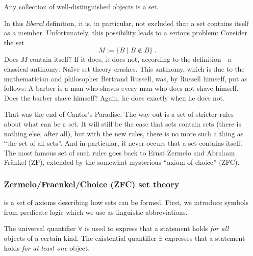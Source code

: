 \begin{definition}\label{def:cantor}
Any collection of well-distinguished objects is a set.
\end{definition}

In this \emph{liberal} definition, it is, in particular, not excluded that a set contains itself as a member. 
Unfortunately, this possibility leads to a serious problem:  
Consider the set
\[
M:=\{B \mid B \notin B\}\; .
\]
Does \(M\) contain itself?  If it does, it does not, according to the definition—a classical antinomy:  
Naïve set theory crashes.
This antinomy, which is due to the mathematician and philosopher Bertrand Russell, was, by Russell himself, put as follows: 
A barber is a man who shaves every man who does not shave himself. 
Does the barber shave himself? 
Again, he does exactly when he does not.

That was the end of Cantor's Paradise. 
The way out is a set of stricter rules about what can be a set. 
It will still be the case that sets contain sets (there is nothing else, after all), but with the new rules, there is no more such a thing as ``the set of all sets''. 
And in particular, it never occurs that a set contains itself. 
The most famous set of such rules goes back to Ernst Zermelo and Abraham Fränkel (ZF), extended by the somewhat mysterious ``axiom of choice'' (ZFC).

\subsubsection{Zermelo/Fraenkel/Choice (ZFC) set theory}\label{subsubsec:zfc}
is a set of axioms describing how sets can be formed.
First, we introduce symbols from predicate logic which we use as linguistic abbreviations.

\begin{definition}[Quantifiers]\label{def:quantifiers}
The universal quantifier \(\forall\) is used to express that a statement holds \emph{for all} objects of a certain kind.
The existential quantifier \(\exists\) expresses that a statement holds \emph{for at least one} object.
\end{definition}



